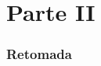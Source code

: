 \documentclass[10pt, compress]{beamer}
\begin{document}
\part{Parte II}

\maketitle

\section{Retomada}

%
%
%
%
%
%
%
\end{document}
